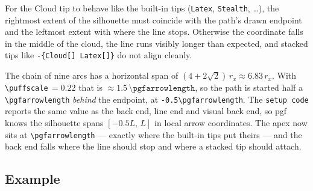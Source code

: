 \documentclass[11pt]{article}
\begin{document}
For the Cloud tip to behave like the built-in tips
(\texttt{Latex}, \texttt{Stealth}, \dots), the rightmost extent
of the silhouette must coincide with the path's drawn endpoint
and the leftmost extent with where the line stops.  Otherwise
the coordinate falls in the middle of the cloud, the line runs
visibly longer than expected, and stacked tips like
\texttt{-\{Cloud[] Latex[]\}} do not align cleanly.

The chain of nine arcs has a horizontal span of
$(4+2\sqrt{2})\,r_x \approx 6.83\,r_x$.  With
\texttt{\textbackslash puffscale}\,$=0.22$ that is
$\approx 1.5\,\texttt{\textbackslash pgfarrowlength}$, so the
path is started half a \texttt{\textbackslash pgfarrowlength}
\emph{behind} the endpoint, at
\texttt{-0.5\textbackslash pgfarrowlength}.  The
\texttt{setup code} reports the same value as the back end,
line end and visual back end, so pgf knows the silhouette
spans $[-0.5L,\,L]$ in local arrow coordinates.  The apex now
sits at \texttt{\textbackslash pgfarrowlength} — exactly where
the built-in tips put theirs — and the back end falls where the
line should stop and where a stacked tip should attach.

\subsection*{Example}

\noindent{}
\end{document}
